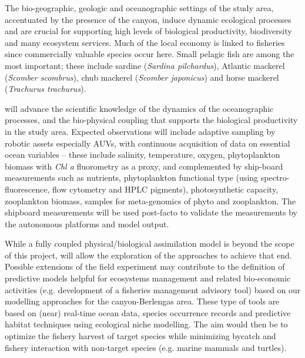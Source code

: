 The bio-geographic, geologic and oceanographic settings of the study
area, accentuated by the presence of the \naz canyon, induce dynamic
ecological processes and are crucial for supporting high levels of
biological productivity, biodiversity and many ecosystem
services. Much of the local economy is linked to fisheries since
commercially valuable species occur here. Small pelagic fish are among
the most important; these include sardine (\emph{Sardina pilchardus}),
Atlantic mackerel (\emph{Scomber scombrus}), chub mackerel
(\emph{Scomber japonicus}) and horse mackerel (\emph{Trachurus
  trachurus}).

\proj will advance the scientific knowledge of the dynamics of the
oceanographic processes, and the bio-physical coupling that supports
the biological productivity in the study area. Expected observations
will include adaptive sampling by robotic assets especially AUVs, with
continuous acquisition of data on essential ocean variables -- these
include salinity, temperature, oxygen, phytoplankton biomass with
\emph{Chl a} fluorometry as a proxy, and complemented by ship-board
measurements such as nutrients, phytoplankton functional type (using
spectro-fluorescence, flow cytometry and HPLC pigments), photosynthetic
capacity, zooplankton biomass, samples for meta-genomics of phyto and
zooplankton.  The shipboard measurements will be used post-facto to
validate the measurements by the autonomous platforms and model
output.

While a fully coupled physical/biological assimilation model is beyond
the scope of this project, \proj will allow the exploration of the
approaches to achieve that end.  Possible extensions of the field
experiment may contribute to the definition of predictive models
helpful for ecosystems management and related bio-economic activities
(e.g. development of a fisheries management advisory tool) based on
our modelling approaches for the \naz canyon-Berlengas area. These
type of tools are based on (near) real-time ocean data, species
occurrence records and predictive habitat techniques using ecological
niche modelling. The aim would then be to optimize the fishery harvest
of target species while minimizing bycatch and fishery interaction
with non-target species (e.g. marine mammals and turtles).


